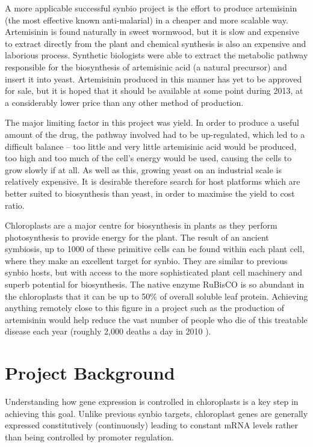 \documentclass[twoside,a4paper]{article}
\begin{document}
\begin{multicols}{2}
A more applicable successful synbio project is the effort to produce 
artemisinin (the most effective known anti-malarial) in a cheaper and more 
scalable way.
Artemisinin is found naturally in sweet wormwood, but it is slow and expensive
to extract directly from the plant and chemical synthesis is also an expensive
and laborious process.
Synthetic biologists were able to extract the metabolic pathway responsible for
the biosynthesis of artemisinic acid (a natural precursor) and insert it into 
yeast\cite{yeast}.
Artemisinin produced in this manner has yet to be approved for sale, but it is
hoped that it should be available at some point during 2013, at a considerably
lower price than any other method of production.

The major limiting factor in this project was yield.
In order to produce a useful amount of the drug, the pathway involved had to be
up-regulated, which led to a difficult balance -- too little and very little
artemisinic acid would be produced, too high and too much of the cell's
energy would be used, causing the cells to grow slowly if at all.
As well as this, growing yeast on an industrial scale is relatively expensive.
It is desirable therefore search for host platforms which are better suited to
biosynthesis than yeast, in order to maximise the yield to cost ratio.

Chloroplasts are a major centre for biosynthesis in plants as they perform
photosynthesis to provide energy for the plant.
The result of an ancient symbiosis, up to 1000 of these primitive cells can be 
found within each plant cell, where they make an excellent target for synbio.
They are similar to previous synbio hosts, but with access to the more
sophisticated plant cell machinery and superb potential for biosynthesis.
The native enzyme RuBisCO is so abundant in the chloroplasts that it 
can be up to 50\% of overall soluble leaf protein.
Achieving anything remotely close to this figure in a project such as the
production of artemisinin would help reduce the vast number of people who die 
of this treatable disease each year (roughly 2,000 deaths a day in 2010
\cite{malaria}).


\section{Project Background}

Understanding how gene expression is controlled in chloroplasts is a key step
in achieving this goal.
Unlike previous synbio targets, chloroplast genes are generally expressed
constitutively (continuously) leading to constant mRNA levels rather than 
being controlled by promoter regulation\cite{Sugita1996}.


\end{multicols}
\end{document}
